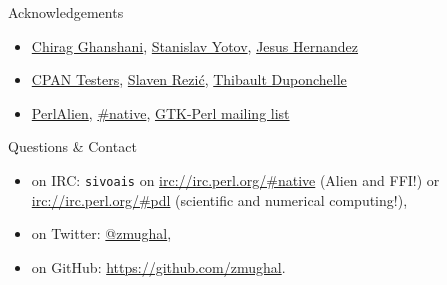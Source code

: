 \begin{frame}{Acknowledgements}
\protect\hypertarget{acknowledgements}{}

\begin{itemize}
\item
  \href{https://github.com/ChiragGhanshani}{Chirag Ghanshani},
  \href{https://github.com/svyotov}{Stanislav Yotov},
  \href{https://twitter.com/j3sus_h}{Jesus Hernandez}
\item
  \href{https://github.com/cpan-testers/cpantesters-project}{CPAN
  Testers}, \href{https://metacpan.org/author/SREZIC}{Slaven Rezić},
  \href{https://metacpan.org/author/CONTRA}{Thibault Duponchelle}
\item
  \href{https://github.com/PerlAlien}{PerlAlien},
  \href{irc://irc.perl.org/\#native}{\#native},
  \href{https://mail.gnome.org/archives/gtk-perl-list/}{GTK-Perl mailing list}
\end{itemize}

\end{frame}

\begin{frame}{Questions \& Contact} %
\begin{itemize}
	\item on IRC: \texttt{sivoais} on \url{irc://irc.perl.org/\#native}
		(Alien and FFI!) or \url{irc://irc.perl.org/\#pdl} (scientific and numerical computing!),
	\item on Twitter: \href{https://twitter.com/zmughal}{@zmughal},
	\item on GitHub: \url{https://github.com/zmughal}.
\end{itemize}

\end{frame}


